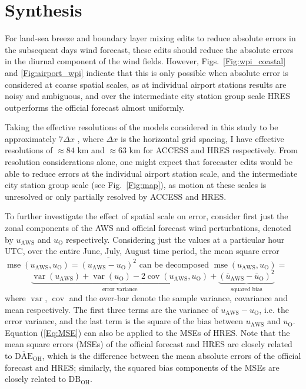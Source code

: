 \documentclass[twocol]{ametsoc}
\DeclareMathOperator{\mse}{mse}
\DeclareMathOperator{\cov}{cov}
\DeclareMathOperator{\var}{var}
\begin{document}
\section{Synthesis}
\label{Sec:Discussion}
For land-sea breeze and boundary layer mixing edits to reduce absolute errors in the subsequent days wind forecast, these edits should reduce the absolute errors in the diurnal component of the wind fields. However, Figs.~\ref{Fig:wpi_coastal} and \ref{Fig:airport_wpi} indicate that this is only possible when absolute error is considered at coarse spatial scales, as at individual airport stations results are noisy and ambiguous, and over the intermediate city station group scale HRES outperforms the official forecast almost uniformly.

Taking the effective resolutions of the models considered in this study to be approximately $7\Delta x$ \citep[e.g.][]{skamarock04, abdalla13}, where $\Delta x$ is the horizontal grid spacing, I have effective resolutions of $\approx 84$ km and $\approx 63$ km for ACCESS and HRES respectively. From resolution considerations alone, one might expect that forecaster edits would be able to reduce errors at the individual airport station scale, and the intermediate city station group scale (see Fig.~\ref{Fig:map}), as motion at these scales is unresolved or only partially resolved by ACCESS and HRES. 

To further investigate the effect of spatial scale on error, consider first just the zonal components of the AWS and official forecast wind perturbations, denoted by $u_\text{AWS}$ and $u_\text{O}$ respectively. Considering just the values at a particular hour UTC, over the entire June, July, August time period, the mean square error $\mse\left(u_\text{AWS}, u_\text{O}\right) = \overline{\left(u_\text{AWS} - u_\text{O}\right)^2}$ can be decomposed $\mse\left(u_\text{AWS}, u_\text{O}\right)=$ 
\begin{equation}
\underbrace{\var\left(u_\text{AWS}\right) + \var\left(u_\text{O}\right) - 2\cov\left(u_\text{AWS}, u_\text{O}\right)}_\text{error variance} + \underbrace{\left(\overline{u}_\text{AWS} - \overline{u}_\text{O}\right)^2}_{\text{squared bias}} \label{Eq:MSE}
\end{equation}
where $\var$, $\cov$ and the over-bar denote the sample variance, covariance and mean respectively. The first three terms are the variance of $u_\text{AWS} - u_\text{O}$, i.e. the error variance, and the last term is the square of the bias between $u_\text{AWS}$ and $u_\text{O}$. Equation (\ref{Eq:MSE}) can also be applied to the MSEs of HRES. Note that the mean square errors (MSEs) of the official forecast and HRES are closely related to $\overline{\text{DAE}}_\text{OH}$, which is the difference between the mean absolute errors of the official forecast and HRES; similarly, the squared bias components of the MSEs are closely related to $\text{DB}_\text{OH}$. 
\end{document}
